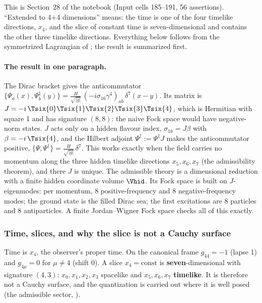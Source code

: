 This is Section~28 of the notebook (Input cells 185--191, 56 assertions). ``Extended to 4+4
dimensions'' means: the time is one of the four timelike directions, $x_4$, and the slice of
constant time is seven-dimensional and contains the other three timelike directions. Everything
below follows from the symmetrized Lagrangian of ; the result is summarized first.

\paragraph{The result in one paragraph.} The Dirac bracket gives the anticommutator
$\{\Psi_a(x),\Psi^{\ddagger}_b(y)\}=\frac{H}{\sqrt{|g|}}\,(-i\sigma_{16}\gamma^4)_{ab}\,\delta^7(x-y)$.
Its matrix is $J=-i\,\Tsix{0}\Tsix{1}\Tsix{2}\Tsix{3}\Tsix{4}$, which is Hermitian with square 1 and
has signature $(8,8)$: the naive Fock space would have negative-norm states. $J$ acts only on a
hidden flavour index, $\sigma_{16}=J\beta$ with $\beta=-i\,\Tsix{4}$, and the Hilbert adjoint
$\Psi^{\dagger}:=\Psi^{\ddagger}J$ makes the anticommutator positive,
$\{\Psi,\Psi^{\dagger}\}=\frac{H}{\sqrt{|g|}}\,\delta^7$. This works exactly when the field carries no
momentum along the three hidden timelike directions $x_5,x_6,x_7$ (the admissibility theorem), and
there $J$ is unique. The admissible theory is a dimensional reduction with a finite hidden coordinate
volume $\Vhid$. Its Fock space is built on $J$-eigenmodes: per momentum, 8 positive-frequency and 8
negative-frequency modes; the ground state is the filled Dirac sea; the first excitations are 8
particles and 8 antiparticles. A finite Jordan--Wigner Fock space checks all of this exactly.

\subsubsection{Time, slices, and why the slice is not a Cauchy surface}
\label{sec:3.5.1}

Time is $x_4$, the observer's proper time. On the canonical frame $g_{44}=-1$ (lapse 1) and
$g_{4\mu}=0$ for $\mu\neq4$ (shift 0). A slice $x_4=\text{const}$ is \textbf{seven}-dimensional with
signature $(4,3)$: $x_0,x_1,x_2,x_3$ spacelike and $x_5,x_6,x_7$ \textbf{timelike}. It is therefore
not a Cauchy surface, and the quantization is carried out where it is well posed (the admissible
sector, ).  

